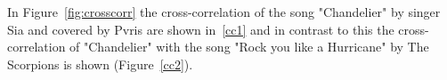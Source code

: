 \noindent In Figure~\ref{fig:crosscorr} the cross-correlation of the song "Chandelier" by singer Sia and covered by Pvris are shown in~\ref{cc1} and in contrast to this the cross-correlation of "Chandelier" with the song "Rock you like a Hurricane" by The Scorpions is shown (Figure~\ref{cc2}). 
\begin{figure}[htbp]
	\centering
\end{figure}
